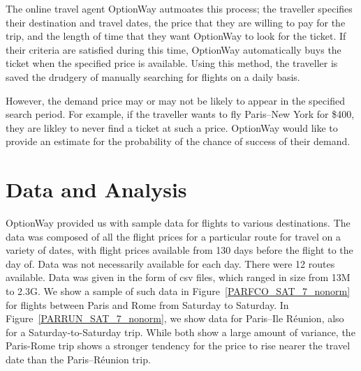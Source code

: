 \documentclass{article}
\begin{document}
The online travel agent OptionWay autmoates this process; the
traveller specifies their destination and travel dates, the price that
they are willing to pay for the trip, and the length of time that they
want OptionWay to look for the ticket.  If their criteria are
satisfied during this time, OptionWay automatically buys the ticket
when the specified price is available.  Using this method, the
traveller is saved the drudgery of manually searching for flights on a
daily basis.

However, the demand price may or may not be likely to appear in the
specified search period.  For example, if the traveller wants to fly
Paris--New York for \$400, they are likley to never find a ticket at
such a price.  OptionWay would like to provide an estimate for the
probability of the chance of success of their demand.

\section{Data and Analysis}

OptionWay provided us with sample data for flights to various
destinations.  The data was composed of all the flight prices for a
particular route for travel on a variety of dates, with flight prices
available from 130 days before the flight to the day of.  Data was not
necessarily available for each day.  There were 12 routes available.
Data was given in the form of csv files, which ranged in size from 13M
to 2.3G. We show a sample of such data in
Figure~\ref{PARFCO_SAT_7_nonorm} for flights between Paris and Rome
from Saturday to Saturday.  In Figure~\ref{PARRUN_SAT_7_nonorm}, we
show data for Paris--Ile Réunion, also for a Saturday-to-Saturday
trip.  While both show a large amount of variance, the Paris-Rome trip
shows a stronger tendency for the price to rise nearer the travel date
than the Paris--Réunion trip.  
\end{document}
